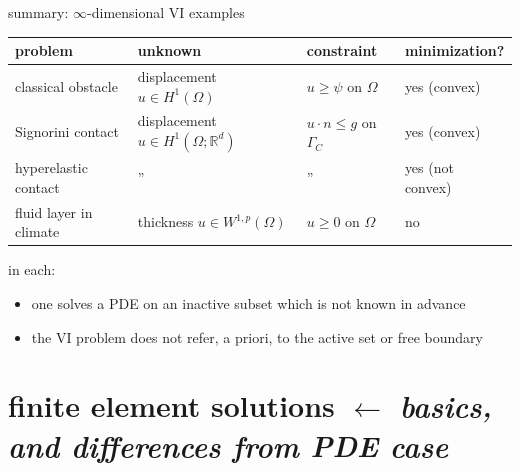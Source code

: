 \documentclass[aspectratio=169,10pt]{beamer}
\begin{document}
\begin{frame}{summary: $\infty$-dimensional VI examples}
\begin{center}

\renewcommand{\arraystretch}{1.25}
\begin{tabular}{llll}

problem                 & unknown                           & constraint              & minimization? \\
\midrule
classical obstacle      & displacement $u\in H^1(\Omega)$   & $u\ge\psi$ on $\Omega$  & yes (convex) \\
Signorini contact       & displacement $u\in H^1(\Omega;\mathbb{R}^d)$ & $u\cdot n\le g$ on $\Gamma_C$ & yes (convex) \\
hyperelastic contact    & \qquad ''                      & \qquad ''               & yes (not convex) \\
fluid layer in climate  & thickness $u\in W^{1,p}(\Omega)$  & $u\ge 0$ on $\Omega$    & no \\
\bottomrule
\end{tabular}
\end{center}

\medskip
in each:
\begin{itemize}
\item one solves a PDE on an inactive subset which is not known in advance
\item the \alert{VI problem does not refer, a priori, to the active set or free boundary}
\end{itemize}

\medskip 
{}
\end{frame}


\section[FE solutions]{finite element solutions \hfill {\small \texorpdfstring{$\leftarrow$}{←} \emph{basics, and differences from PDE case}}}
\end{document}
